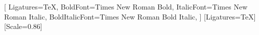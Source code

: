 
\usepackage[fontsize=13pt]{fontsize}

\usepackage{fontspec}
%
\usepackage[english,vietnamese]{babel}
\setmainfont{Times New Roman}[
  Ligatures=TeX,
  BoldFont={Times New Roman Bold},
  ItalicFont={Times New Roman Italic},
  BoldItalicFont={Times New Roman Bold Italic},
]
\setsansfont{Arial}[Ligatures=TeX]
\setmonofont{Consolas}[Scale=0.86]


\usepackage[
  a4paper, top=2.5cm, bottom=2.5cm, left=3.5cm, right=2.0cm,
  headheight=18pt, headsep=0.6cm, footskip=1.2cm
]{geometry}
\usepackage{setspace}
\onehalfspacing                       %
\setlength{\parindent}{1cm}
\setlength{\parskip}{0.2\baselineskip}

\usepackage{amsmath}
\usepackage{mathtools}

